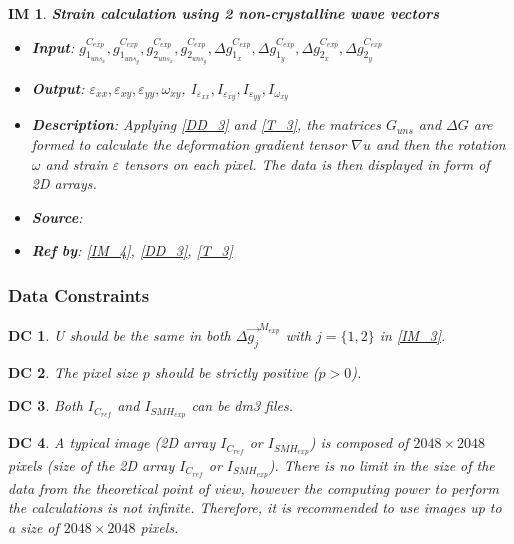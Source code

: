 \documentclass[12pt]{article}
\newtheorem{DC}{DC}
\newtheorem{IM}{IM}
\begin{document}
\begin{IM}
\label{IM_5}
\noindent\colorbox{shadecolorIM}{\normalfont \textbf{Strain calculation using 2 non-crystalline wave vectors}}
\normalfont
\begin{itemize}
\item \textbf{Input}: $g_{1_{{uns}_x}}^{C_{exp}}, g_{1_{{uns}_y}}^{C_{exp}},g_{2_{{uns}_x}}^{C_{exp}}, g_{2_{{uns}_y}}^{C_{exp}}, \Delta g_{1_{x}}^{C_{exp}}, \Delta g_{1_{y}}^{C_{exp}},\Delta g_{2_{x}}^{C_{exp}},\Delta g_{2_{y}}^{C_{exp}}$
\item \textbf{Output}: $\varepsilon_{xx},\varepsilon_{xy},\varepsilon_{yy},\omega_{xy}$, $I_{\varepsilon_{xx}},I_{\varepsilon_{xy}},I_{\varepsilon_{yy}},I_{\omega_{xy}}$
\item \textbf{Description}: Applying \cref{DD_3} and \cref{T_3}, the matrices $G_{uns}$ and $\Delta G$ are formed to calculate the deformation gradient tensor $\nabla u$ and then the rotation $\omega$ and strain $\varepsilon$ tensors on each pixel. The data is then displayed in form of 2D arrays.
\item \textbf{Source}: \cite{Hytch1998,Rouviere2005}
\item \textbf{Ref by}: \cref{IM_4}, \cref{DD_3}, \cref{T_3}
\end{itemize}
\end{IM}

\subsubsection{Data Constraints} \label{sec_DataConstraints}

\begin{DC}
\label{DC_1}
\normalfont U should be the same in both $\Delta \overrightarrow{g_{j}}^{M_{exp}}$ with $j=\{1,2\}$ in \cref{IM_3}.
\end{DC}    
\begin{DC}
\label{DC_2}
\normalfont The pixel size $p$ should be strictly positive ($p>0$).
\end{DC}
\begin{DC}
\label{DC_3}
\normalfont Both $I_{C_{ref}}$ and $I_{SMH_{exp}}$ can be dm3 files.
\end{DC}
\begin{DC}
\label{DC_4}
\normalfont A typical image (2D array $I_{C_{ref}}$ or $I_{SMH_{exp}}$) is composed of $2048 \times 2048$ pixels (size of the 2D array $I_{C_{ref}}$ or $I_{SMH_{exp}}$). There is no limit in the size of the data from the theoretical point of view, however the computing power to perform the calculations is not infinite. Therefore, it is recommended to use images up to a size of $2048 \times 2048$ pixels.
\end{DC}
\end{document}
